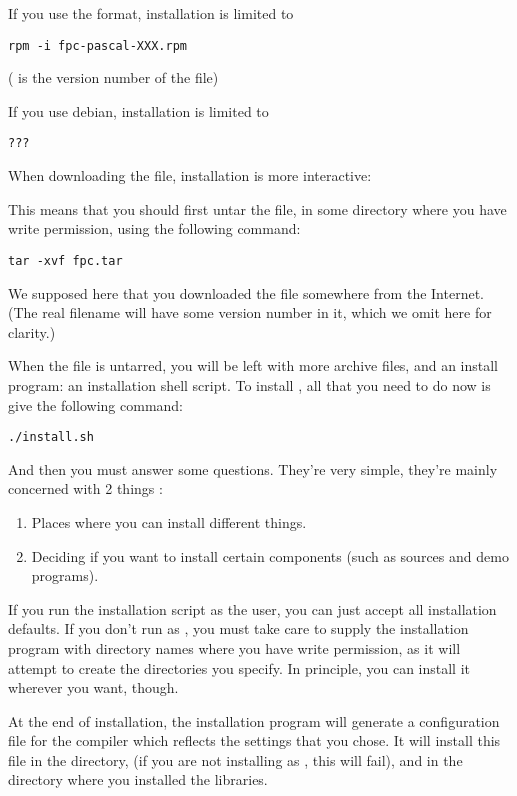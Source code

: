 \documentclass{report}
\begin{document}
If you use the  format, installation is limited to
\begin{verbatim}
rpm -i fpc-pascal-XXX.rpm
\end{verbatim}
( is the version number of the  file)

If you use debian, installation is limited to 
\begin{verbatim}
???
\end{verbatim}

When downloading the  file, installation is more interactive:

This means that you should first untar the file, in some directory where 
you have write permission, using the following command:
\begin{verbatim}
tar -xvf fpc.tar
\end{verbatim}
We supposed here that you downloaded the file  somewhere
from the Internet. (The real filename will have some version number in it, 
which we omit here for clarity.)

When the file is untarred, you will be left with more archive files, and
an install program: an installation shell script.
To install \fpc, all that you need to do now is give the following command:
\begin{verbatim}
./install.sh
\end{verbatim}
And then you must answer some questions. They're very simple, they're
mainly concerned with 2 things :
\begin{enumerate}
\item Places where you can install different things.
\item Deciding if you want to install certain components (such as sources
and demo programs).
\end{enumerate}
If you run the installation script as the  user, you can just accept all installation
defaults. If you don't run as , you must take care to supply the
installation program with directory names where you have write permission,
as it will attempt to create the directories you specify.
In principle, you can install it wherever you want, though.

At the end of installation, the installation program will generate a
configuration file for the \fpc compiler which reflects the settings
that you chose. It will install this file in the  directory, (if
you are not installing as , this will fail), and in the
directory where you installed the libraries.
\end{document}
